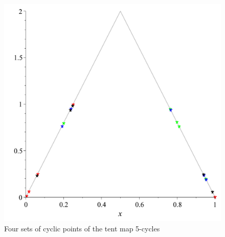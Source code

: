 \documentclass[12pt,a4paper]{amsart}
\begin{document}
\begin{figure}[h!]
\centering
\includegraphics[scale=0.28]{Fig4}
\caption{Four sets of cyclic points of the tent map 5-cycles} \label{f4}
\end{figure}
\end{document}
